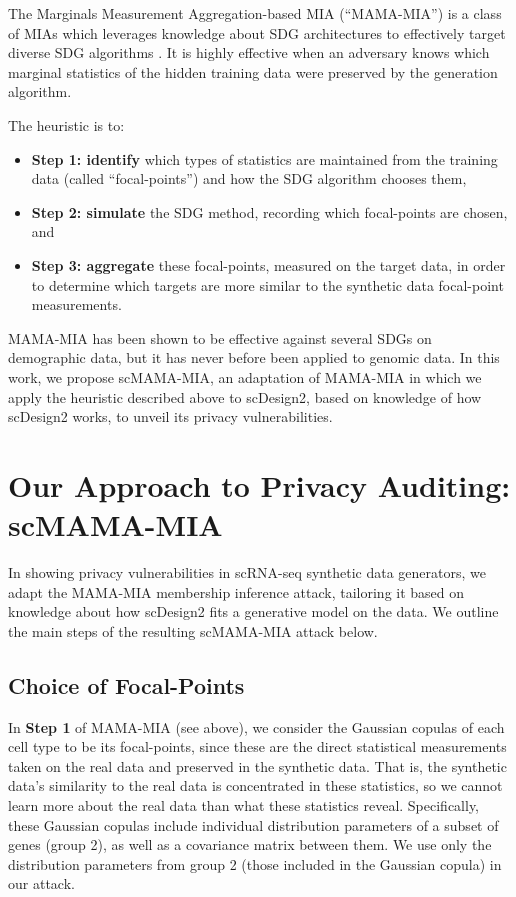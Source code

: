 \documentclass[unnumsec,webpdf,contemporary,large]{oup-authoring-template}%
\theoremstyle{thmstyleone}%
\theoremstyle{thmstyletwo}%
\theoremstyle{thmstylethree}%
\begin{document}
The Marginals Measurement Aggregation-based MIA (``MAMA-MIA'') is a class of MIAs which leverages knowledge about SDG architectures to effectively target diverse SDG algorithms \cite{golob_privacy_2025}. It is highly effective when an adversary knows which marginal statistics of the hidden training data were preserved by the generation algorithm.

The heuristic is to:
\begin{itemize}
    \item \textbf{Step 1: identify} which types of statistics are maintained from the training data (called ``focal-points'') and how the SDG algorithm chooses them,
    \item \textbf{Step 2: simulate} the SDG method, recording which focal-points are chosen, and
    \item \textbf{Step 3: aggregate} these focal-points, measured on the target data, in order to determine which targets are more similar to the synthetic data focal-point measurements.
\end{itemize} 

MAMA-MIA has been shown to be effective against several SDGs on demographic data, but it has never before been applied to genomic data. In this work, we propose scMAMA-MIA, an adaptation of MAMA-MIA in which we apply the heuristic described above to scDesign2, based on knowledge of how scDesign2 works, to unveil its privacy vulnerabilities. 


\section{Our Approach to Privacy Auditing: scMAMA-MIA}\label{sec:scmamamia}

In showing privacy vulnerabilities in scRNA-seq synthetic data generators, we adapt the MAMA-MIA membership inference attack, tailoring it based on knowledge about how scDesign2 fits a generative model on the data. We outline the main steps of the resulting scMAMA-MIA attack below. 

\subsection{Choice of Focal-Points}

In \textbf{Step 1} of MAMA-MIA (see above), we consider the Gaussian copulas of each cell type to be its focal-points, since these are the direct statistical measurements taken on the real data and preserved in the synthetic data. 
That is, the synthetic data's similarity to the real data is concentrated in these statistics, so we cannot learn more about the real data than what these statistics reveal.
Specifically, these Gaussian copulas include
individual distribution parameters of a subset of genes (group 2), as well as a covariance matrix between them. We use only the distribution parameters from group 2 (those included in the Gaussian copula) in our attack.
\end{document}
